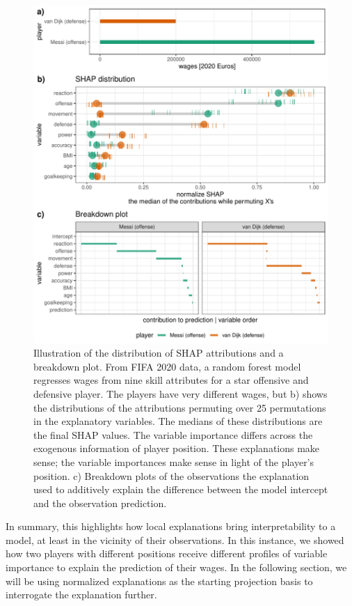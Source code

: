 \documentclass[
  article]{article}
\begin{document}
\begin{figure}

{\centering \includegraphics[width=29.17in]{./figures/shap_distr_bd} 

}

\caption{Illustration of the distribution of SHAP attributions and a breakdown plot. From FIFA 2020 data, a random forest model regresses wages from nine skill attributes for a star offensive and defensive player. The players have very different wages, but b) shows the distributions of the attributions permuting over 25 permutations in the explanatory variables. The medians of these distributions are the final SHAP values. The variable importance differs across the exogenous information of player position. These explanations make sense; the variable importances make sense in light of the player's position. c) Breakdown plots of the observations the explanation used to additively explain the difference between the model intercept and the observation prediction.}\label{fig:shapdistrbd}
\end{figure}

In summary, this highlights how local explanations bring interpretability to a model, at least in the vicinity of their observations. In this instance, we showed how two players with different positions receive different profiles of variable importance to explain the prediction of their wages. In the following section, we will be using normalized explanations as the starting projection basis to interrogate the explanation further.
\end{document}
